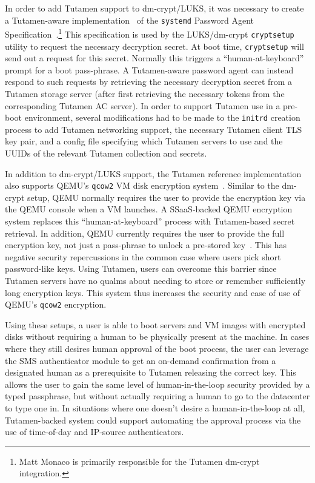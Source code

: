 In order to add Tutamen support to dm-crypt/LUKS, it was necessary to
create a Tutamen-aware implementation~\cite{src-tutamen-askpassword}
of the \texttt{systemd} Password Agent
Specification~\cite{systemd-passwordagents}.\footnote{Matt Monaco is
  primarily responsible for the Tutamen dm-crypt integration.}  This
specification is used by the LUKS/dm-crypt \texttt{cryptsetup} utility
to request the necessary decryption secret. At boot time,
\texttt{cryptsetup} will send out a request for this secret. Normally
this triggers a ``human-at-keyboard'' prompt for a boot pass-phrase. A
Tutamen-aware password agent can instead respond to such requests by
retrieving the necessary decryption secret from a Tutamen storage
server (after first retrieving the necessary tokens from the
corresponding Tutamen AC server). In order to support Tutamen use in a
pre-boot environment, several modifications had to be made to the
\texttt{initrd} creation process to add Tutamen networking support,
the necessary Tutamen client TLS key pair, and a config file
specifying which Tutamen servers to use and the UUIDs of the relevant
Tutamen collection and secrets.

In addition to dm-crypt/LUKS support, the Tutamen reference
implementation also supports QEMU's \texttt{qcow2} VM disk encryption
system~\cite{src-qemu-tutamen}. Similar to the dm-crypt setup, QEMU
normally requires the user to provide the encryption key via the QEMU
console when a VM launches. A SSaaS-backed QEMU encryption system
replaces this ``human-at-keyboard'' process with Tutamen-based secret
retrieval. In addition, QEMU currently requires the user to provide
the full encryption key, not just a pass-phrase to unlock a pre-stored
key~\cite{berrange-qemucrypto}. This has negative security
repercussions in the common case where users pick short password-like
keys. Using Tutamen, users can overcome this barrier since Tutamen
servers have no qualms about needing to store or remember sufficiently
long encryption keys. This system thus increases the security and ease
of use of QEMU's \texttt{qcow2} encryption.

Using these setups, a user is able to boot servers and VM images with
encrypted disks without requiring a human to be physically present at
the machine. In cases where they still desires human approval of the
boot process, the user can leverage the SMS authenticator module to
get an on-demand confirmation from a designated human as a
prerequisite to Tutamen releasing the correct key. This allows the
user to gain the same level of human-in-the-loop security provided by
a typed passphrase, but without actually requiring a human to go to
the datacenter to type one in. In situations where one doesn't desire
a human-in-the-loop at all, Tutamen-backed system could support
automating the approval process via the use of time-of-day and
IP-source authenticators.

